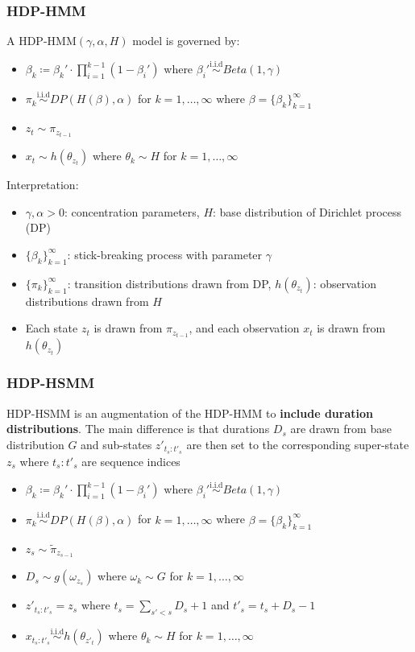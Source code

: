 \documentclass{beamer}
\begin{document}
\begin{frame}
    \frametitle{HDP-HMM}
    A HDP-HMM$(\gamma, \alpha, H)$ model is governed by:
    \begin{itemize}
      \item $\beta_k \coloneqq \beta_k'\cdot \prod_{i=1}^{k-1} (1-\beta_i')$ where $\beta_i' \overset{\text{i.i.d}}{\sim} Beta(1,\gamma)$
      \item $\pi_k \overset{\text{i.i.d}}{\sim} DP(H(\beta), \alpha)$ for $k = 1, \dots, \infty$ where $\beta = \{\beta_k\}_{k=1}^{\infty}$
      \item $z_t \sim \pi_{z_{t-1}}$
      \item $x_t \sim h(\theta_{z_t})$ where $\theta_{k} \sim H$ for $k = 1, \dots, \infty$
    \end{itemize}
    Interpretation:
    \begin{itemize}
        \item $\gamma, \alpha > 0$: concentration parameters, $H$: base distribution of Dirichlet process (DP)
        \item $\{\beta_k\}_{k=1}^{\infty}$: stick-breaking process with parameter $\gamma$
        \item $\{\pi_k \}_{k=1}^{\infty}$: transition distributions drawn from DP, $h(\theta_{z_t})$: observation distributions drawn from $H$
        \item Each state $z_t$ is drawn from $\pi_{z_{t-1}}$, and each observation $x_t$ is drawn from $h(\theta_{z_t})$
    \end{itemize}
\end{frame}

\begin{frame}
    \frametitle{HDP-HSMM}
    HDP-HSMM is an augmentation of the HDP-HMM to \textbf{include duration distributions}. The main difference is that durations $D_s$ are drawn from base distribution $G$ and sub-states $z'_{t_{s}:t'_{s}}$ are then set to the corresponding super-state $z_{s}$ where $t_{s}:t'_{s}$ are sequence indices
    \begin{itemize}
      \item $\beta_k \coloneqq \beta_k'\cdot \prod_{i=1}^{k-1} (1-\beta_i')$ where $\beta_i' \overset{\text{i.i.d}}{\sim} Beta(1,\gamma)$
      \item $\pi_k \overset{\text{i.i.d}}{\sim} DP(H(\beta), \alpha)$ for $k = 1, \dots, \infty$ where $\beta = \{\beta_k\}_{k=1}^{\infty}$
      \item $z_s \sim \tilde{\pi}_{z_{s-1}}$
      \item $D_s \sim g(\omega_{z_s})$ where $\omega_k \sim G$ for $k = 1, \dots, \infty$
      \item $z'_{t_{s}:t'_{s}} = z_s$ where $t_{s} = \sum_{s' < s} D_s + 1$ and $t'_{s} = t_{s} + D_s - 1$
      \item $x_{t_{s}: t'_{s}} \overset{\text{i.i.d}}{\sim} h(\theta_{z'_t})$ where $\theta_{k} \sim H$ for $k = 1, \dots, \infty$
    \end{itemize}
\end{frame}
\end{document}
